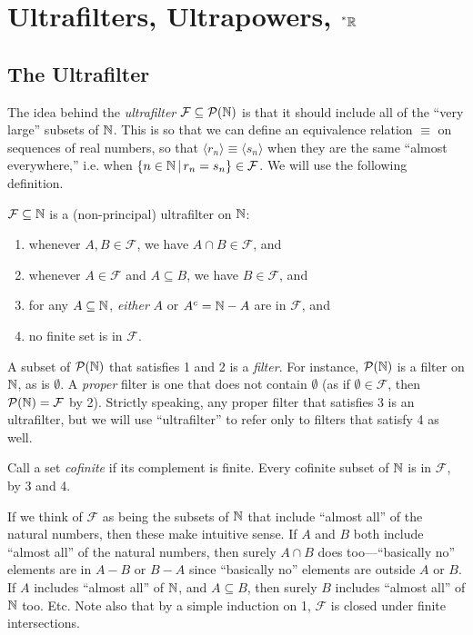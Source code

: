 \section{Ultrafilters, Ultrapowers, \texorpdfstring{$\prescript{*}{}{\mathbb{R}}$}{*R}}\label{sec:Ultrapowers}
\subsection{The Ultrafilter}
The idea behind the \textit{ultrafilter} $\mathcal{F} \subseteq \mathcal{P}(\mathbb{N})$ is that it should include all of the ``very large'' subsets of $\mathbb{N}$. This is so that we can define an equivalence relation $\equiv$ on sequences of real numbers, so that $\langle r_n \rangle \equiv \langle s_n \rangle$ when they are the same ``almost everywhere,'' i.e. when $\{n \in \mathbb{N} \,|\, r_n = s_n \} \in \mathcal{F}$. We will use the following definition.

\begin{defn}
    $\mathcal{F} \subseteq \mathbb{N}$ is a (non-principal) ultrafilter on $\mathbb{N}$:
    \begin{enumerate}
        \item whenever $A, B \in \mathcal{F}$, we have $A \cap B \in \mathcal{F}$, and
        \item whenever $A \in \mathcal{F}$ and $A \subseteq B$, we have $B \in \mathcal{F}$, and
        \item for any $A \subseteq \mathbb{N}$, \textit{either} $A$ or $A^c = \mathbb{N} - A$ are in $\mathcal{F}$, and
        \item no finite set is in $\mathcal{F}$.
    \end{enumerate}
\end{defn}

A subset of $\mathcal{P}(\mathbb{N})$ that satisfies 1 and 2 is a \textit{filter}. For instance, $\mathcal{P}(\mathbb{N})$ is a filter on $\mathbb{N}$, as is $\emptyset$. A \textit{proper} filter is one that does not contain $\emptyset$ (as if $\emptyset \in \mathcal{F}$, then $\mathcal{P}(\mathbb{N}) = \mathcal{F}$ by 2). Strictly speaking, any proper filter that satisfies 3 is an ultrafilter, but we will use ``ultrafilter'' to refer only to filters that satisfy 4 as well. 

Call a set \textit{cofinite} if its complement is finite. Every cofinite subset of $\mathbb{N}$ is in $\mathcal{F}$, by 3 and 4. 

If we think of $\mathcal{F}$ as being the subsets of $\mathbb{N}$ that include ``almost all'' of the natural numbers, then these make intuitive sense. If $A$ and $B$ both include ``almost all'' of the natural numbers, then surely $A \cap B$ does too---``basically no'' elements are in $A - B$ or $B - A$ since ``basically no'' elements are outside $A$ or $B$. If $A$ includes ``almost all'' of $\mathbb{N}$, and $A \subseteq B$, then surely $B$ includes ``almost all'' of $\mathbb{N}$ too. Etc. Note also that by a simple induction on 1, $\mathcal{F}$ is closed under finite intersections.

